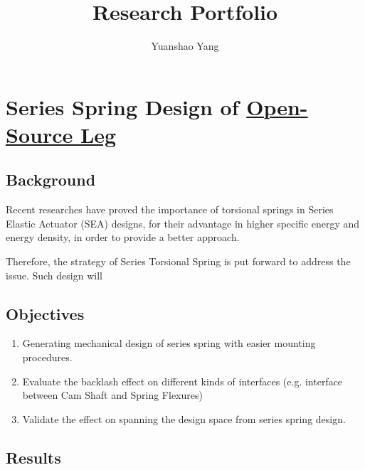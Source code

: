 \documentclass[12pt]{article}
\title{Research Portfolio}
\author{Yuanshao Yang}
\begin{document}
\maketitle


\tableofcontents
\newpage

\section{Series Spring Design of \href{https://www.opensourceleg.org/}{Open-Source Leg}}

\subsection{Background}


Recent researches have proved the importance of torsional springs in Series Elastic Actuator (SEA) designs, for their advantage in higher specific energy and energy density, in order to provide a better approach. 


Therefore, the strategy of Series Torsional Spring is put forward to address the issue. Such design will  




\subsection{Objectives}

\begin{enumerate}

    \item {Generating mechanical design of series spring with easier mounting procedures.}
    \item {Evaluate the backlash effect on different kinds of interfaces (e.g. interface between Cam Shaft and Spring Flexures)}
    \item {Validate the effect on spanning the design space from series spring design.}

\end{enumerate}

\subsection{Results}
\end{document}
